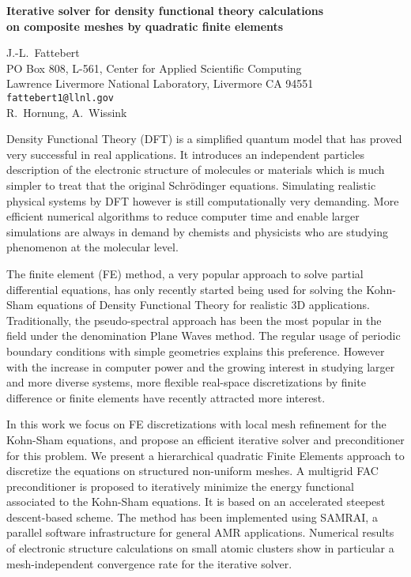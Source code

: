 \documentclass{report}
\begin{document}

\begin{center}
{\large
{\bf Iterative solver for density functional theory calculations \\
	on composite meshes by quadratic finite elements}}

	J.-L.~Fattebert \\
	PO Box 808, L-561, Center for Applied Scientific Computing \\
	Lawrence Livermore National Laboratory, Livermore CA 94551 \\
	{\tt fattebert1@llnl.gov} \\
	R.~Hornung, A.~Wissink
\end{center}
Density Functional Theory (DFT) is a simplified quantum
model that has proved very successful in real applications.
It introduces an independent particles description of the
electronic structure of molecules or materials which is much
simpler to treat that the original Schr\"{o}dinger equations.
Simulating realistic physical systems by DFT however is
still computationally very demanding. More efficient
numerical algorithms to reduce computer time and enable
larger simulations are always in demand by chemists and
physicists who are studying phenomenon at the molecular
level.

The finite element (FE) method, a very popular
approach to solve partial differential equations, has only
recently started being used for solving the Kohn-Sham
equations of Density Functional Theory for realistic 3D
applications. Traditionally, the pseudo-spectral approach
has been the most popular in the field under the
denomination Plane Waves method. The regular usage of
periodic boundary conditions with simple geometries explains
this preference. However with the increase in computer power
and the growing interest in studying larger and more diverse
systems, more flexible real-space discretizations by finite
difference or finite elements have recently attracted more
interest.

In this work we focus on FE discretizations
with local mesh refinement for the Kohn-Sham equations, and
propose an efficient iterative solver and preconditioner for
this problem. We present a hierarchical quadratic Finite
Elements approach to discretize the equations on structured
non-uniform meshes. A multigrid FAC preconditioner is
proposed to iteratively minimize the energy functional
associated to the Kohn-Sham equations. It is based on an
accelerated steepest descent-based scheme. The method has
been implemented using SAMRAI, a parallel software
infrastructure for general AMR applications. Numerical
results of electronic structure calculations on small atomic
clusters show in particular a mesh-independent convergence
rate for the iterative solver.



\end{document}
